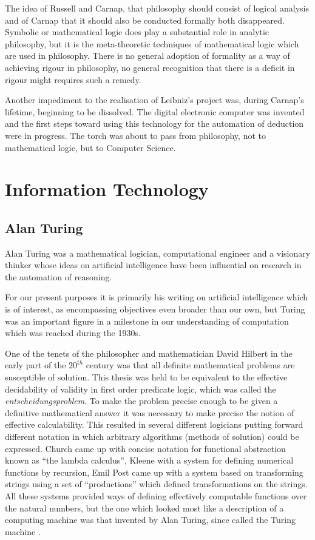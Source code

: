 The idea of Russell and Carnap, that philosophy should consist of logical analysis and of Carnap that it should also be conducted formally both disappeared.
Symbolic or mathematical logic does play a substantial role in analytic philosophy, but it is the meta-theoretic techniques of mathematical logic which are used in philosophy.
There is no general adoption of formality as a way of achieving rigour in philosophy, no general recognition that there is a deficit in rigour might requires such a remedy.

Another impediment to the realisation of Leibniz's project was, during Carnap's lifetime, beginning to be dissolved.
The digital electronic computer was invented and the first steps toward using this technology for the automation of deduction were in progress.
The torch was about to pass from philosophy, not to mathematical logic, but to Computer Science.

\section{Information Technology}

\subsection{Alan Turing}

Alan Turing was a mathematical logician, computational engineer and a visionary thinker whose ideas on artificial intelligence have been influential on research in the automation of reasoning.

For our present purposes it is primarily his writing on artificial intelligence which is of interest, as encompassing objectives even broader than our own, but Turing was an important figure in a milestone in our understanding of computation which was reached during the 1930s.

One of the tenets of the philosopher and mathematician David Hilbert in the early part of the $20^{th}$ century was that all definite mathematical problems are susceptible of solution.
This thesis was held to be equivalent to the effective decidability of validity in first order predicate logic, which was called the \emph{entscheidungsproblem}.
To make the problem precise enough to be given a definitive mathematical answer it was necessary to make precise the notion of effective calculability.
This resulted in several different logicians putting forward different notation in which arbitrary algorithms (methods of solution) could be expressed.
Church came up with concise notation for functional abstraction known as ``the lambda calculus'', Kleene with a system for defining numerical functions by recursion, Emil Post came up with a system based on transforming strings using a set of ``productions'' which defined transformations on the strings.
All these systems provided ways of defining effectively computable functions over the natural numbers, but the one which looked most like a description of a computing machine was that invented by Alan Turing, since called the Turing machine \cite{turingOCN}.

